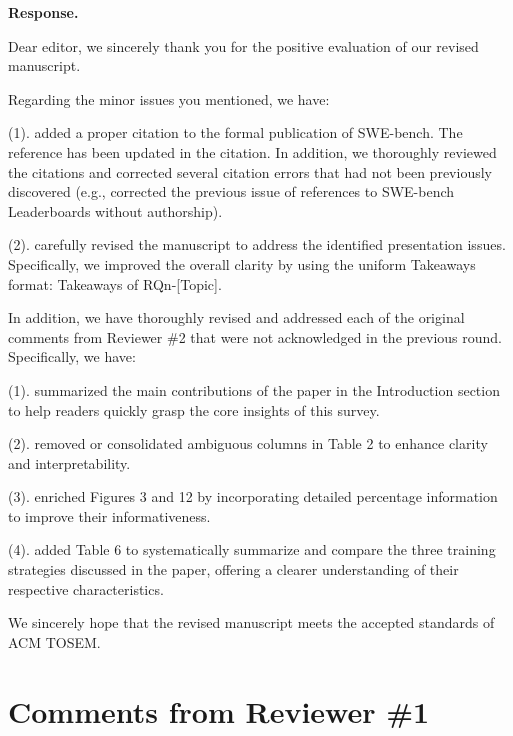 \documentclass[acmsmall]{acmart}
\begin{document}
	\noindent
	\textbf{Response.}

	Dear editor, we sincerely thank you for the positive evaluation of our revised manuscript.

	Regarding the minor issues you mentioned, we have:

	(1). added a proper citation to the formal publication of SWE-bench. The reference has been
	updated in the citation. In addition, we thoroughly reviewed the citations and corrected several
	citation errors that had not been previously discovered (e.g., corrected the previous issue of references
	to SWE-bench Leaderboards without authorship).

	(2). carefully revised the manuscript to address the identified presentation issues.
	Specifically, we improved the overall clarity by using the uniform Takeaways format: Takeaways
	of RQn-[Topic].
	\vspace{1em}

	In addition, we have thoroughly revised and addressed each of the original comments from Reviewer
	\#2 that were not acknowledged in the previous round. Specifically, we have:

	(1). summarized the main contributions of the paper in the Introduction section to help readers quickly
	grasp the core insights of this survey.

	(2). removed or consolidated ambiguous columns in Table 2 to enhance clarity and
	interpretability.

	(3). enriched Figures 3 and 12 by incorporating detailed percentage information to improve their
	informativeness.

	(4). added Table 6 to systematically summarize and compare the three training strategies
	discussed in the paper, offering a clearer understanding of their respective characteristics.
	\vspace{1em}

	We sincerely hope that the revised manuscript meets the accepted standards of ACM TOSEM.

	\section{Comments from Reviewer \#1}

\end{document}
